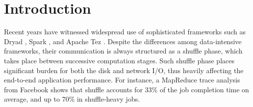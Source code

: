 \section{Introduction}
Recent years have witnessed widespread use of sophisticated frameworks such as Dryad \cite{dryad}, Spark \cite{spark}, and Apache Tez \cite{tez}.
Despite the differences among data-intensive frameworks, their communication is always structured as a shuffle phase,  which takes place between successive computation stages. Such shuffle phase places significant burden for both the disk and network I/O, thus heavily affecting the end-to-end application performance. For instance, a MapReduce trace analysis from Facebook shows that shuffle accounts for 33\% of the job completion time on average, and up to 70\% in shuffle-heavy jobs\cite{managing}.

